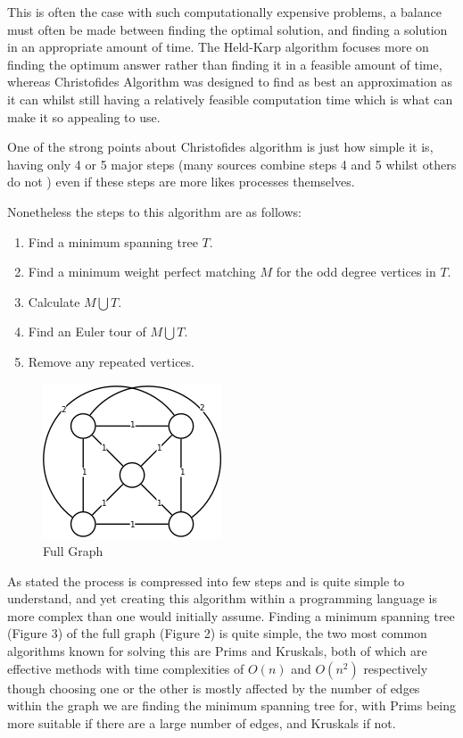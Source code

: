 \documentclass[11pt,a4paper,titlepage]{article}
\begin{document}
This is often the case with such computationally expensive problems, a balance must often be made between finding the optimal solution, and finding a solution in an appropriate amount of time. The Held-Karp algorithm focuses more on finding the optimum answer rather than finding it in a feasible amount of time, whereas Christofides Algorithm was designed to find as best an approximation as it can whilst still having a relatively feasible computation time which is what can make it so appealing to use. 

One of the strong points about Christofides algorithm is just how simple it is, having only 4 or 5 major steps (many sources combine steps 4 and 5 whilst others do not \cite{ChrAlgSlides, ChrAlgSteps}) even if these steps are more likes processes themselves. 

Nonetheless the steps to this algorithm are as follows:
\begin{enumerate}
	\item Find a minimum spanning tree $T$.
	\item Find a minimum weight perfect matching $M$ for the odd degree vertices in $T$.
	\item Calculate $M \bigcup T$.
	\item Find an Euler tour of $M \bigcup T$.
	\item Remove any repeated vertices.
\end{enumerate}

\begin{figure}[ht]
	\includegraphics[scale=0.75]{WikiCompleteGraph}
	\centering
	\caption{Full Graph}
\end{figure}

\clearpage
As stated the process is compressed into few steps and is quite simple to understand, and yet creating this algorithm within a programming language is more complex than one would initially assume. Finding a minimum spanning tree (Figure 3) of the full graph (Figure 2) is quite simple, the two most common algorithms known for solving this are Prims and Kruskals, both of which are effective methods with time complexities of $O(n)$ and $O(n^2)$ respectively \cite{PvKTime} though choosing one or the other is mostly affected by the number of edges within the graph we are finding the minimum spanning tree for, with Prims being more suitable if there are a large number of edges, and Kruskals if not.
\end{document}
